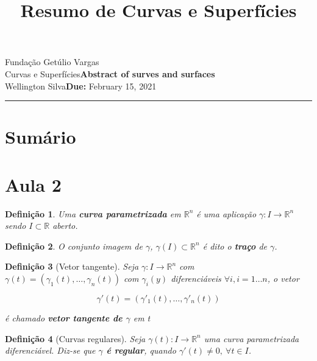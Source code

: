 \documentclass{article}
\title{Resumo de Curvas e Superfícies}
\author{}
\date{}
\newtheorem{definition}{Definição}
\newcommand{\assignment}{Abstract of surves and surfaces}
\newcommand{\duedate}{February 15, 2021}
\begin{document}
Fundação Getúlio Vargas\hfill\\
Curvas e Superfícies\hfill\textbf{\assignment}\\
Wellington Silva\hfill\textbf{Due:} \duedate\\
\smallskip\hrule\bigskip

{\let\newpage\relax\maketitle}
\maketitle

\section*{Sumário}

\textbf{}
\vspace{4.0mm}

\newpage

\section*{Aula 2}
\label{s1}

\begin{definition}
Uma \textbf{curva parametrizada} em $\mathbb{R}^n$ é uma aplicação $\gamma: I \rightarrow \mathbb{R}^n$ sendo $I \subset \mathbb{R}$ aberto.
\end{definition}

\begin{definition}
O conjunto imagem de $\gamma$, $\gamma(I) \subset \mathbb{R}^n$ é dito o \textbf{traço} de $\gamma$.
\end{definition}

\begin{definition}[Vetor tangente]
Seja $\gamma: I \rightarrow \mathbb{R}^n$ com $\gamma(t) = (\gamma_1 (t), \ldots, \gamma_n (t))$ com $\gamma_i (y)$ diferenciáveis $\forall i, i = 1 \ldots n$, o vetor

$$\gamma'(t) = (\gamma'_1 (t), \ldots, \gamma'_n (t))$$

é chamado \textbf{vetor tangente de $\gamma$} em t
\end{definition}

\begin{definition}[Curvas regulares]
Seja $\gamma (t): I \rightarrow \mathbb{R}^n$ uma curva parametrizada diferenciável. Diz-se que \textbf{$\gamma$ é regular}, quando $\gamma'(t) \neq 0,\ \forall t \in I$. 
\end{definition}
\end{document}
